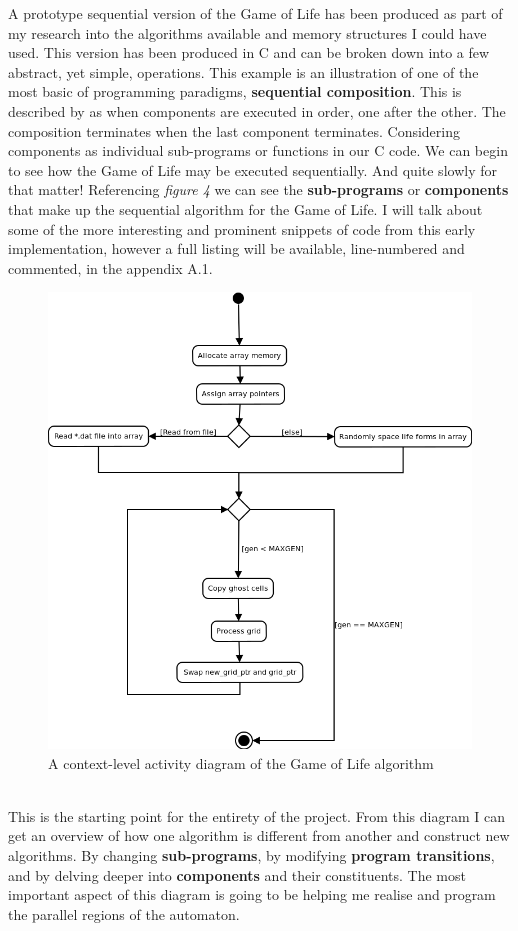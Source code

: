 \documentclass[11pt]{article} %
\begin{document}
A prototype sequential version of the Game of Life has been produced as part of my research into the algorithms available and memory structures I could have used. This version has been produced in C and can be broken down into a few abstract, yet simple, operations. This example is an illustration of one of the most basic of programming paradigms, {\bf sequential composition}. This is described by \cite[Chandry and Taylor, p68]{ref9} as when components are executed in order, one after the other. The composition terminates when the last component terminates. Considering components as individual sub-programs or functions in our C code. We can begin to see how the Game of Life may be executed sequentially. And quite slowly for that matter! Referencing {\it figure 4} we can see the {\bf sub-programs} or {\bf components} that make up the sequential algorithm for the Game of Life. I will talk about some of the more interesting and prominent snippets of code from this early implementation, however a full listing will be available, line-numbered and commented, in the appendix A.1.\\
\begin{figure}[h]
\centering
\includegraphics[scale=0.5]{sequential0.png}
\caption{A context-level activity diagram of the Game of Life algorithm}
\label{fig: Algo0}
\end{figure}
\\This is the starting point for the entirety of the project. From this diagram I can get an overview of how one algorithm is different from another and construct new algorithms. By changing {\bf sub-programs}, by modifying {\bf program transitions}, and by delving deeper into {\bf components} and their constituents. The most important aspect of this diagram is going to be helping me realise and program the parallel regions of the automaton.
\end{document}
